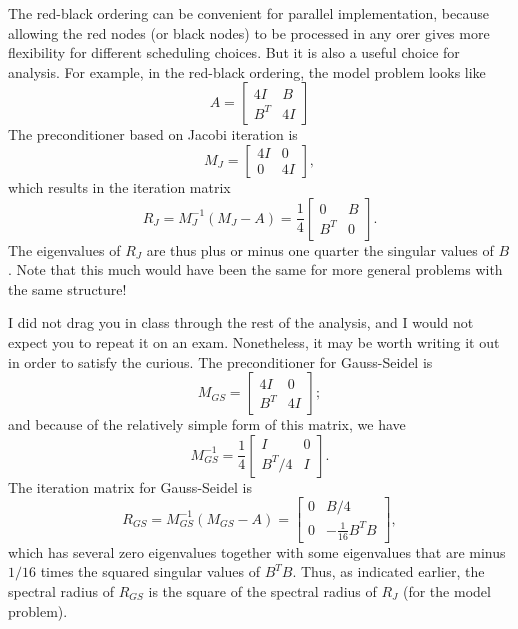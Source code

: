 \documentclass[12pt, leqno]{article} %
\begin{document}
The red-black ordering can be convenient for parallel implementation,
because allowing the red nodes (or black nodes) to be processed in any
orer gives more flexibility for different scheduling choices.  But it
is also a useful choice for analysis.  For example, in the red-black
ordering, the model problem looks like
\[
  A = \begin{bmatrix} 4I & B \\ B^T & 4I \end{bmatrix}
\]
The preconditioner based on Jacobi iteration is
\[
  M_J = \begin{bmatrix} 4I & 0 \\ 0 & 4 I \end{bmatrix},
\]
which results in the iteration matrix
\[
  R_J = M_J^{-1} (M_J-A) =
  \frac{1}{4} \begin{bmatrix} 0 & B \\ B^T & 0 \end{bmatrix}.
\]
The eigenvalues of $R_J$ are thus plus or minus one quarter the
singular values of $B$.  Note that this much would have been the same
for more general problems with the same structure!

I did not drag you in class through the rest of the analysis, and I
would not expect you to repeat it on an exam.  Nonetheless, it may be
worth writing it out in order to satisfy the curious.
The preconditioner for Gauss-Seidel is
\[
  M_{GS} = \begin{bmatrix} 4I & 0 \\ B^T & 4I \end{bmatrix};
\]
and because of the relatively simple form of this matrix, we have
\[
  M_{GS}^{-1} =
  \frac{1}{4}
  \begin{bmatrix}
    I & 0 \\
    B^T/4 & I
  \end{bmatrix}.
\]
The iteration matrix for Gauss-Seidel is
\[
  R_{GS} = M_{GS}^{-1} (M_{GS}-A) =
  \begin{bmatrix} 0 & B/4 \\ 0 & -\frac{1}{16} B^T B \end{bmatrix},
\]
which has several zero eigenvalues together with some eigenvalues that
are minus $1/16$ times the squared singular values of $B^T B$.  Thus,
as indicated earlier, the spectral radius of $R_{GS}$ is the square of
the spectral radius of $R_{J}$ (for the model problem).
\end{document}
